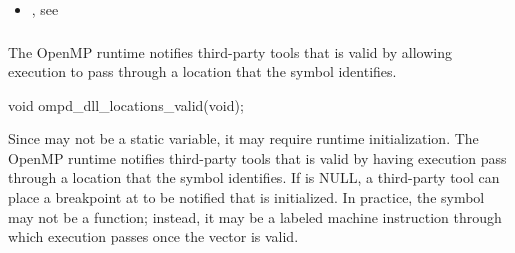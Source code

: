 \crossreferences
\begin{itemize}
\item   {}, 
see 
\end{itemize}



\subsubsection{}
\label{subsubsec:ompd_dll_locations_valid}

\summary
The OpenMP runtime notifies third-party tools that 
is valid by allowing execution to pass through a location that the symbol 
 identifies.

\format
\begin{cspecific}
\begin{ompSyntax}
void ompd_dll_locations_valid(void);
\end{ompSyntax}
\end{cspecific}

\descr
Since  may not be a static variable, it may require
runtime initialization. The OpenMP runtime notifies third-party tools that 
 is valid by having execution pass through a location 
that the symbol  identifies. If 
 is NULL, a third-party tool can place a breakpoint 
at  to be notified that  
is initialized. In practice, the symbol  
may not be a function; instead, it may be a labeled machine instruction through
which execution passes once the vector is valid.

